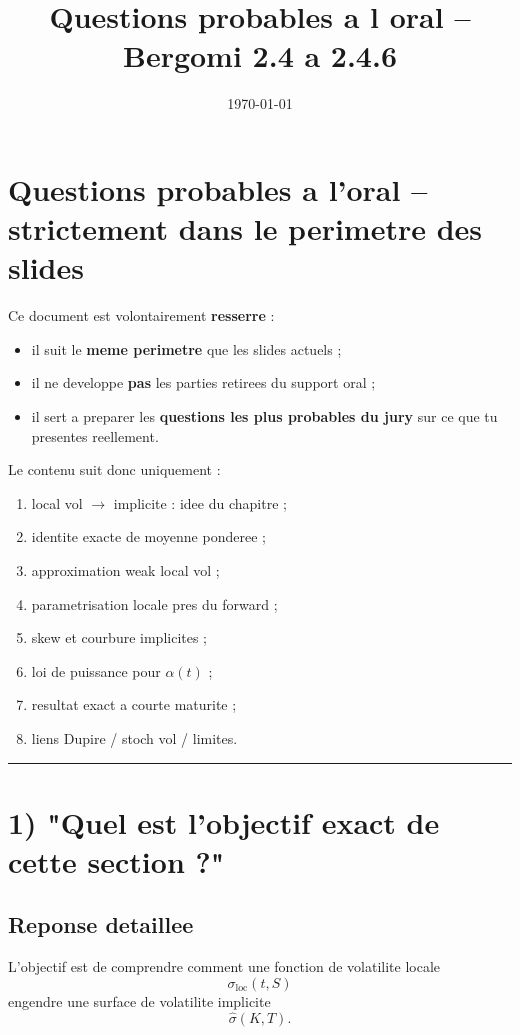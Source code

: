 \documentclass[11pt,a4paper]{article}
\title{Questions probables a l oral -- Bergomi 2.4 a 2.4.6}
\author{}
\date{\today}
\begin{document}
\maketitle
\tableofcontents
\newpage
\section{Questions probables a l'oral -- strictement dans le perimetre des slides}

Ce document est volontairement \textbf{resserre} :

\begin{itemize}
\item il suit le \textbf{meme perimetre} que les slides actuels ;
\item il ne developpe \textbf{pas} les parties retirees du support oral ;
\item il sert a preparer les \textbf{questions les plus probables du jury} sur ce que tu presentes reellement.
\end{itemize}

Le contenu suit donc uniquement :

\begin{enumerate}
\item local vol \(\to\) implicite : idee du chapitre ;
\item identite exacte de moyenne ponderee ;
\item approximation weak local vol ;
\item parametrisation locale pres du forward ;
\item skew et courbure implicites ;
\item loi de puissance pour \(\alpha(t)\) ;
\item resultat exact a courte maturite ;
\item liens Dupire / stoch vol / limites.
\end{enumerate}

\bigskip\hrule\bigskip

\section{1) "Quel est l'objectif exact de cette section ?"}

\subsection{Reponse detaillee}

L'objectif est de comprendre comment une fonction de volatilite locale
\[
\sigma_{\mathrm{loc}}(t,S)
\]
engendre une surface de volatilite implicite
\[
\hat{\sigma}(K,T).
\]
\end{document}
